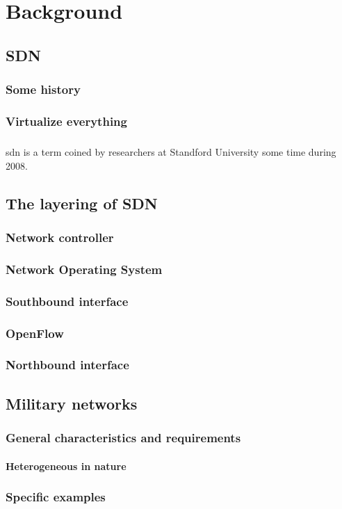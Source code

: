\chapter{Background}
\label{ch:background}

\section{SDN}
\cite{MK08} \cite{Mo13} \cite{Me12} \cite{St13}
\subsection{Some history}
\subsection{Virtualize everything}
\paragraph{} \gls{sdn} is a term coined by researchers at Standford University some time during 2008.
\section{The layering of SDN}
\subsection{Network controller}
\subsection{Network Operating System}
\subsection{Southbound interface}
\subsection{OpenFlow}
\subsection{Northbound interface}
\section{Military networks}
\subsection{General characteristics and requirements}
\subsubsection{Heterogeneous in nature}
\subsection{Specific examples}
